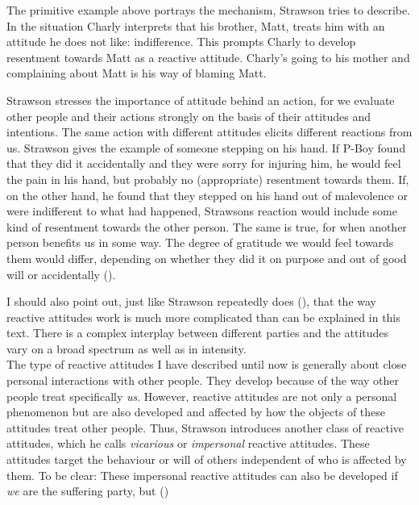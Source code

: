 \documentclass{article}
\newcounter{example}
\begin{document}
The primitive example above portrays the mechanism, Strawson tries to describe.
In the situation Charly interprets that his brother, Matt, treats him with an
attitude he does not like: indifference. This prompts Charly to develop
resentment towards Matt as a reactive attitude. Charly's going to his mother and
complaining about Matt is his way of blaming Matt.

Strawson stresses the importance of attitude behind an action, for we evaluate
other people and their actions strongly on the basis of their attitudes and
intentions. The same action with different attitudes elicits different reactions
from us. Strawson gives the example of someone stepping on his hand. If P-Boy
found that they did it accidentally and they were sorry for injuring him, he
would feel the pain in his hand, but probably no (appropriate) resentment
towards them. If, on the other hand, he found that they stepped on his hand out
of malevolence or were indifferent to what had happened, Strawsons reaction
would include some kind of resentment towards the other person. The same is
true, for when another person benefits us in some way. The degree of gratitude
we would feel towards them would differ, depending on whether they did it on
purpose and out of good will or accidentally (\cite[p.6]{Strawson1962}).



I should also point out, just like Strawson repeatedly does (\cite[p.5,
p.7]{Strawson1962}), that the way reactive attitudes work is much more
complicated than can be explained in this text. There is a complex
interplay between different parties and the attitudes vary on a broad spectrum
as well as in intensity.\\

The type of reactive attitudes I have described until now is generally about close
personal interactions with other people. They develop because of the way other
people treat specifically \textit{us}. 
However, reactive attitudes are not only a personal phenomenon but are also developed
and affected by how the objects of these attitudes treat other people.
Thus, Strawson introduces another class of reactive attitudes, which he calls
\textit{vicarious} or \textit{impersonal} reactive attitudes. These attitudes
target the behaviour or will of others independent of who is affected by them.
To be clear: These impersonal reactive attitudes can also be
developed if \textit{we} are the suffering party, but (\cite[p.15]{Strawson1962})
\end{document}
